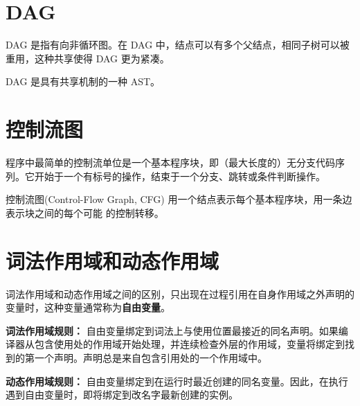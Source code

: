 \documentclass[12pt]{article}
\begin{document}
\section*{DAG}

DAG 是指有向非循环图。在 DAG 中，结点可以有多个父结点，相同子树可以被重用，这种共享使得 DAG 更为紧凑。

DAG 是具有共享机制的一种 AST。

\section*{控制流图}

程序中最简单的控制流单位是一个基本程序块，即（最大长度的）无分支代码序列。它开始于一个有标号的操作，结束于一个分支、跳转或条件判断操作。

控制流图(Control-Flow Graph, CFG) 用一个结点表示每个基本程序块，用一条边表示块之间的每个可能 的控制转移。

\section*{词法作用域和动态作用域}

词法作用域和动态作用域之间的区别，只出现在过程引用在自身作用域之外声明的变量时，这种变量通常称为\textbf{自由变量}。

\textbf{词法作用域规则：} 自由变量绑定到词法上与使用位置最接近的同名声明。如果编译器从包含使用处的作用域开始处理，并连续检查外层的作用域，变量将绑定到找到的第一个声明。声明总是来自包含引用处的一个作用域中。

\textbf{动态作用域规则：} 自由变量绑定到在运行时最近创建的同名变量。因此，在执行遇到自由变量时，即将绑定到改名字最新创建的实例。
\end{document}
